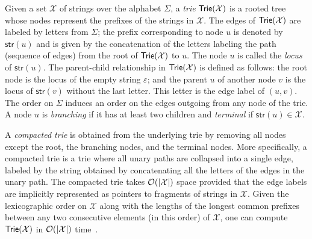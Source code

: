 Given a set $\mathcal{X}$ of strings over the alphabet $\Sigma$, a \emph{trie} $\textup{\textsf{Trie}}(\mathcal{X})$ is a rooted tree whose nodes represent the prefixes of the strings in $\mathcal{X}$.
The edges of $\textup{\textsf{Trie}}(\mathcal{X})$ are labeled by letters from $\Sigma$; the prefix corresponding to node $u$ is denoted by $\textsf{str}(u)$ and is given by the concatenation of the letters labeling the path (sequence of edges) from the root of $\textup{\textsf{Trie}}(\mathcal{X})$ to $u$. The node $u$ is called the \emph{locus} of $\textsf{str}(u)$. 
The parent-child relationship in $\textup{\textsf{Trie}}(\mathcal{X})$ is defined as follows: the root node is the locus of the empty string $\varepsilon$; and the
parent $u$ of another node $v$ is the locus of $\textsf{str}(v)$ without the last letter. This letter is the edge label of $(u,v)$. The order on $\Sigma$ induces an order on the edges outgoing from any node of the trie. A node $u$ is \emph{branching} if it has at least two children and \emph{terminal} if $\textsf{str}(u) \in \mathcal{X}$. 

A \emph{compacted trie} is obtained from the underlying trie by removing all nodes except the root, the branching nodes, and the terminal nodes.
More specifically, a compacted trie is a trie where all unary paths are collapsed into a single edge, labeled by the string obtained by concatenating all the letters of the edges in the unary path.
The compacted trie takes $\mathcal{O}(|\mathcal{X}|)$ space provided that the edge labels are implicitly represented as pointers to fragments of strings in $\mathcal{X}$. Given the lexicographic order on $\mathcal{X}$ along with the lengths of the longest common prefixes between any two consecutive elements (in this order) of $\mathcal{X}$, one can compute $\textup{\textsf{Trie}}(\mathcal{X})$ in $\mathcal{O}(|\mathcal{X}|)$ time~\cite{DBLP:conf/cpm/KasaiLAAP01}.

